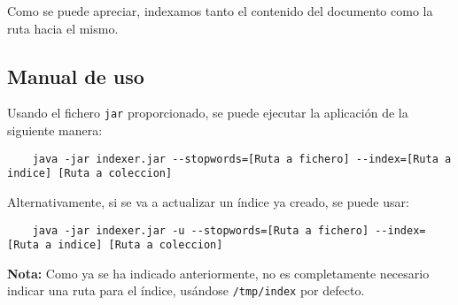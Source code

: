 Como se puede apreciar, indexamos tanto el contenido del documento como la ruta hacia el mismo.

\subsection{Manual de uso}

Usando el fichero \verb|jar| proporcionado, se puede ejecutar la aplicación de la siguiente manera:

\begin{lstlisting}
    java -jar indexer.jar --stopwords=[Ruta a fichero] --index=[Ruta a indice] [Ruta a coleccion]
\end{lstlisting}

Alternativamente, si se va a actualizar un índice ya creado, se puede usar:

\begin{lstlisting}
    java -jar indexer.jar -u --stopwords=[Ruta a fichero] --index=[Ruta a indice] [Ruta a coleccion]
\end{lstlisting}

\textbf{Nota:} Como ya se ha indicado anteriormente, no es completamente necesario indicar una ruta para el índice, usándose \verb|/tmp/index| por defecto.